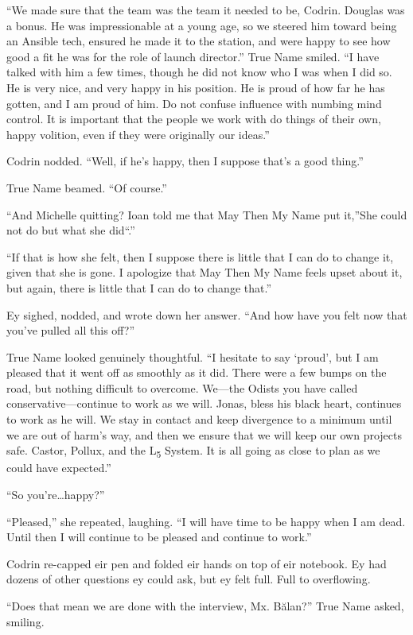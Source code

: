 ``We made sure that the team was the team it needed to be, Codrin. Douglas was a bonus. He was impressionable at a young age, so we steered him toward being an Ansible tech, ensured he made it to the station, and were happy to see how good a fit he was for the role of launch director.'' True Name smiled. ``I have talked with him a few times, though he did not know who I was when I did so. He is very nice, and very happy in his position. He is proud of how far he has gotten, and I am proud of him. Do not confuse influence with numbing mind control. It is important that the people we work with do things of their own, happy volition, even if they were originally our ideas.''

Codrin nodded. ``Well, if he's happy, then I suppose that's a good thing.''

True Name beamed. ``Of course.''

``And Michelle quitting? Ioan told me that May Then My Name put it,''She could not do but what she did``.''

``If that is how she felt, then I suppose there is little that I can do to change it, given that she is gone. I apologize that May Then My Name feels upset about it, but again, there is little that I can do to change that.''

Ey sighed, nodded, and wrote down her answer. ``And how have you felt now that you've pulled all this off?''

True Name looked genuinely thoughtful. ``I hesitate to say `proud', but I am pleased that it went off as smoothly as it did. There were a few bumps on the road, but nothing difficult to overcome. We---the Odists you have called conservative---continue to work as we will. Jonas, bless his black heart, continues to work as he will. We stay in contact and keep divergence to a minimum until we are out of harm's way, and then we ensure that we will keep our own projects safe. Castor, Pollux, and the L\textsubscript{5} System. It is all going as close to plan as we could have expected.''

``So you're\ldots happy?''

``Pleased,'' she repeated, laughing. ``I will have time to be happy when I am dead. Until then I will continue to be pleased and continue to work.''

Codrin re-capped eir pen and folded eir hands on top of eir notebook. Ey had dozens of other questions ey could ask, but ey felt full. Full to overflowing.

``Does that mean we are done with the interview, Mx. Bălan?'' True Name asked, smiling.

